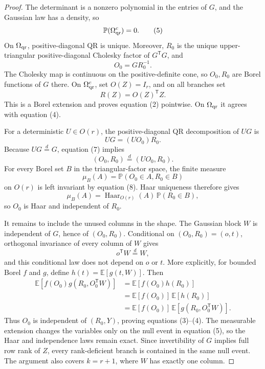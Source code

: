 \begin{proof}
The determinant is a nonzero polynomial in the
entries of \(G\), and the Gaussian law has a density, so
\[
  \mathbb P(\Omega_{\rm qr}^c)=0.                              \tag{5}
\]
On \(\Omega_{\rm qr}\), positive-diagonal QR is unique. Moreover,
\(R_0\) is the unique upper-triangular positive-diagonal Cholesky factor of
\(G^{\mathsf T}G\), and
\[
  O_0=GR_0^{-1}.                                               \tag{6}
\]
The Cholesky map is continuous on the positive-definite cone, so \(O_0,R_0\)
are Borel functions of \(G\) there. On \(\Omega_{\rm qr}^c\), set
\(O(Z)=I_r\), and on all branches set
\[
  R(Z)=O(Z)^{\mathsf T}Z.
\]
This is a Borel extension and proves equation (2) pointwise. On
\(\Omega_{\rm qr}\) it agrees with equation (4).

For a deterministic \(U\in O(r)\), the positive-diagonal QR decomposition of
\(UG\) is
\[
  UG=(UO_0)R_0.                                                \tag{7}
\]
Because \(UG\stackrel d=G\), equation (7) implies
\[
  (O_0,R_0)\stackrel d=(UO_0,R_0).                            \tag{8}
\]
For every Borel set \(B\) in the triangular-factor space, the finite measure
\[
  \mu_B(A)=\mathbb P(O_0\in A,R_0\in B)
\]
on \(O(r)\) is left invariant by equation (8). Haar uniqueness therefore gives
\[
  \mu_B(A)=\operatorname{Haar}_{O(r)}(A)\,
            \mathbb P(R_0\in B),                             \tag{9}
\]
so \(O_0\) is Haar and independent of \(R_0\).

It remains to include the unused columns in the shape. The Gaussian block
\(W\) is independent of \(G\), hence of \((O_0,R_0)\). Conditional on
\((O_0,R_0)=(o,t)\), orthogonal invariance of every column of \(W\) gives
\[
  o^{\mathsf T}W\stackrel d=W,                                \tag{10}
\]
and this conditional law does not depend on \(o\) or \(t\). More explicitly,
for bounded Borel \(f\) and \(g\), define
\(h(t)=\mathbb E[g(t,W)]\). Then
\[
\begin{aligned}
  \mathbb E[f(O_0)g(R_0,O_0^{\mathsf T}W)]
  &=\mathbb E[f(O_0)h(R_0)]\\
  &=\mathbb E[f(O_0)]\,\mathbb E[h(R_0)]\\
  &=\mathbb E[f(O_0)]\,
    \mathbb E[g(R_0,O_0^{\mathsf T}W)].
\end{aligned}\tag{11}
\]
Thus \(O_0\) is independent of \((R_0,Y)\), proving equations (3)--(4). The
measurable extension changes the variables only on the null event in equation
(5), so the Haar and independence laws remain exact. Since invertibility of
\(G\) implies full row rank of \(Z\), every rank-deficient branch is contained
in the same null event. The argument also covers \(k=r+1\), where \(W\) has
exactly one column.


\end{proof}


